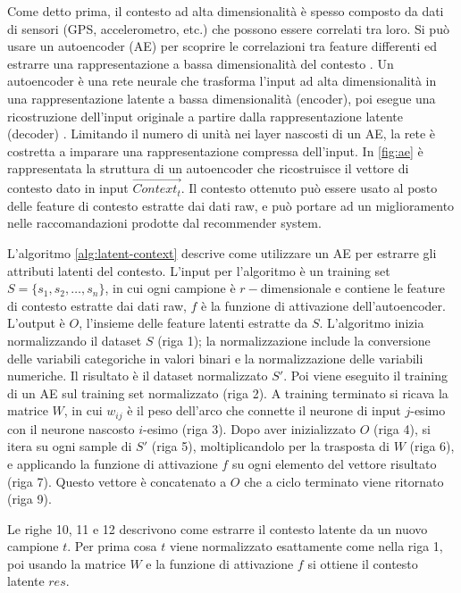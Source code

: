 Come detto prima, il contesto ad alta dimensionalità è spesso composto da dati di sensori (GPS, accelerometro, etc.) che possono essere correlati tra loro. Si può usare un autoencoder (AE) per scoprire le correlazioni tra feature differenti ed estrarre una rappresentazione a bassa dimensionalità del contesto \cite{latent-context}. Un autoencoder è una rete neurale che trasforma l'input ad alta dimensionalità in una rappresentazione latente a bassa dimensionalità (encoder), poi esegue una ricostruzione dell'input originale a partire dalla rappresentazione latente (decoder) \cite{autoencoder}. Limitando il numero di unità nei layer nascosti di un AE, la rete è costretta a imparare una rappresentazione compressa dell'input. In \autoref{fig:ae} è rappresentata la struttura di un autoencoder che ricostruisce il vettore di contesto dato in input $\overrightarrow{Context_t}$. Il contesto ottenuto può essere usato al posto delle feature di contesto estratte dai dati raw, e può portare ad un miglioramento nelle raccomandazioni prodotte dal recommender system.

L'algoritmo \autoref{alg:latent-context} descrive come utilizzare un AE per estrarre gli attributi latenti del contesto. L'input per l'algoritmo è un training set $S = \{s_1, s_2, \dots, s_n\}$, in cui ogni campione è $r-$dimensionale e contiene le feature di contesto estratte dai dati raw, $f$ è la funzione di attivazione dell'autoencoder. L'output è $O$, l'insieme delle feature latenti estratte da $S$. L'algoritmo inizia normalizzando il dataset $S$ (riga 1); la normalizzazione include la conversione delle variabili categoriche in valori binari e la normalizzazione delle variabili numeriche. Il risultato è il dataset normalizzato $S'$. Poi viene eseguito il training di un AE sul training set normalizzato (riga 2). A training terminato si ricava la matrice $W$, in cui $w_{ij}$ è il peso dell'arco che connette il neurone di input $j$-esimo con il neurone nascosto $i$-esimo (riga 3). Dopo aver inizializzato $O$ (riga 4), si itera su ogni sample di $S'$ (riga 5), moltiplicandolo per la trasposta di $W$ (riga 6), e applicando la funzione di attivazione $f$ su ogni elemento del vettore risultato (riga 7). Questo vettore è concatenato a $O$ che a ciclo terminato viene ritornato (riga 9).

Le righe 10, 11 e 12 descrivono come estrarre il contesto latente da un nuovo campione $t$. Per prima cosa $t$ viene normalizzato esattamente come nella riga 1, poi usando la matrice $W$ e la funzione di attivazione $f$ si ottiene il contesto latente $res$.

